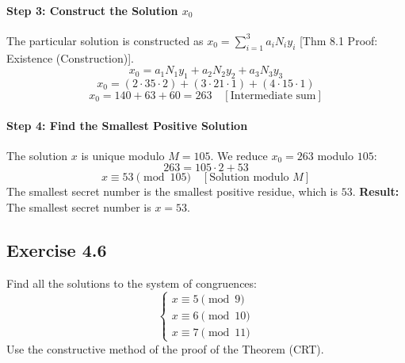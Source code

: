 \begin{solution}
\paragraph{Step 3: Construct the Solution $x_0$}
The particular solution is constructed as $x_0 = \sum_{i=1}^3 a_i N_i y_i$ [Thm 8.1 Proof: Existence (Construction)].
$$ x_0 = a_1 N_1 y_1 + a_2 N_2 y_2 + a_3 N_3 y_3 $$
$$ x_0 = (2 \cdot 35 \cdot 2) + (3 \cdot 21 \cdot 1) + (4 \cdot 15 \cdot 1) $$
$$ x_0 = 140 + 63 + 60 = 263 \quad [\text{Intermediate sum}] $$

\paragraph{Step 4: Find the Smallest Positive Solution}
The solution $x$ is unique modulo $M=105$. We reduce $x_0 = 263$ modulo $105$:
$$ 263 = 105 \cdot 2 + 53 $$
$$ x \equiv 53 \pmod{105} \quad [\text{Solution modulo } M] $$
The smallest secret number is the smallest positive residue, which is $53$.
\textbf{Result:} The smallest secret number is $x=53$.
\end{solution}

\newpage
\subsection*{Exercise 4.6}
Find all the solutions to the system of congruences:
$$ \begin{cases} x \equiv 5 \pmod{9} \\ x \equiv 6 \pmod{10} \\ x \equiv 7 \pmod{11} \end{cases} $$
Use the constructive method of the proof of the Theorem (CRT).

